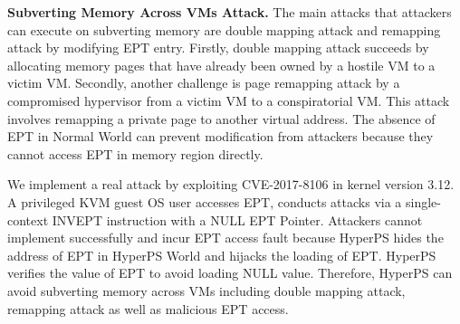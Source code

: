 \documentclass[conference]{IEEEtran}
\begin{document}
\textbf{Subverting Memory Across VMs Attack.}
%
The main attacks that attackers can execute on subverting memory are double mapping attack and remapping attack by modifying EPT entry.
Firstly, double mapping attack succeeds by allocating memory pages that have already been owned by a hostile VM to a victim VM. Secondly, another challenge is page remapping attack by a compromised hypervisor from a victim VM to a conspiratorial VM. This attack involves remapping a private page to another virtual address.
The absence of EPT in Normal World can prevent modification from attackers because they cannot access EPT in memory region directly.



We implement a real attack by exploiting CVE-2017-8106 in kernel version 3.12. A privileged KVM guest OS user accesses EPT, conducts attacks via a single-context INVEPT instruction with a NULL EPT Pointer. Attackers cannot implement successfully and incur EPT access fault because HyperPS hides the address of EPT in HyperPS World and hijacks the loading of EPT. HyperPS verifies the value of EPT to avoid loading NULL value. Therefore, HyperPS can avoid subverting memory across VMs including double mapping attack, remapping attack as well as malicious EPT access.
\end{document}
